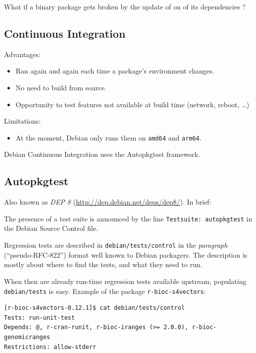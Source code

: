 \documentclass[mingoth,a4paper]{jsarticle}
\providecommand{\tightlist}{%
  \setlength{\itemsep}{0pt}\setlength{\parskip}{0pt}}
\begin{document}
{{What if a binary package gets broken by the update of on of its
dependencies ?

\subsection{Continuous Integration}\label{continuous-integration}

Advantages:

\begin{itemize}
\tightlist
\item
  Ran again and again each time a package's environment changes.
\item
  No need to build from source.
\item
  Opportunity to test features not available at build time (network,
  reboot, \ldots{})
\end{itemize}

Limitations:

\begin{itemize}
\tightlist
\item
  At the moment, Debian only runs them on \texttt{amd64} and
  \texttt{arm64}.
\end{itemize}

Debian Continuous Integration uses the Autopkgtest framework.

\subsection{Autopkgtest}\label{autopkgtest}

Also known as \emph{DEP 8} (\url{http://dep.debian.net/deps/dep8/}). In
brief:

The presence of a test suite is announced by the line
\texttt{Testsuite:\ autopkgtest} in the Debian Source Control file.

Regression tests are described in \texttt{debian/tests/control} in the
\emph{paragraph} (``pseudo-RFC-822'') format well known to Debian
packagers. The description is mostly about where to find the tests, and
what they need to run.

When then are already run-time regression tests available upstream,
populating \texttt{debian/tests} is easy. Example of the package
\texttt{r-bioc-s4vectors}:

\begin{verbatim}
[r-bioc-s4vectors-0.12.1]$ cat debian/tests/control 
Tests: run-unit-test
Depends: @, r-cran-runit, r-bioc-iranges (>= 2.0.0), r-bioc-genomicranges
Restrictions: allow-stderr


\end{verbatim}}}
\end{document}
